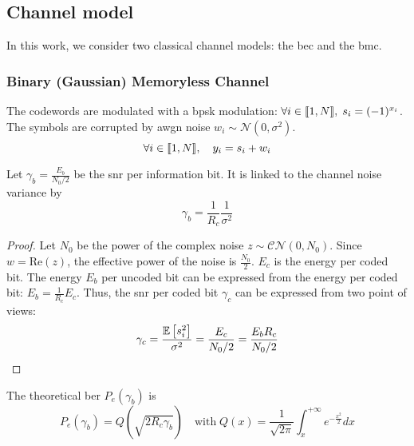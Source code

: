 \subsection{Channel model}
In this work, we consider two classical channel models: the \acrlong{bec} and
the \acrlong{bmc}.

\subsubsection{Binary (Gaussian) Memoryless Channel}
The codewords are modulated with a \acrshort{bpsk} modulation: $\forall i \in
    {\left\llbracket 1, N \right\rrbracket}, \; s_i = (-1)^{x_i}$. The symbols are corrupted by
\acrshort{awgn} noise $w_i \sim \mathcal{N}\left(0, \sigma^2\right)$.
\begin{equation}
    \forall i \in {\left\llbracket 1, N \right\rrbracket}, \quad
    y_i = s_i + w_i
\end{equation}

\begin{iproposition}
    Let $\gamma_b = \frac{E_b}{N_0/2}$ be the \acrshort{snr} per information bit. It is linked to the channel noise variance by
    \begin{equation}
        \gamma_b = \frac{1}{R_c} \frac{1}{\sigma^2}
    \end{equation}
\end{iproposition}

\begin{proof}
    Let $N_0$ be the power of the complex noise $z \sim \mathcal{CN}(0, N_0)$.
    Since $w = \text{Re}(z)$, the effective power of the noise is
    $\frac{N_0}{2}$. $E_c$ is the energy per coded bit. The energy
    $E_b$ per uncoded bit can be expressed from the energy per coded bit: $E_b =
        \frac{1}{R_c} E_c$. Thus, the \acrshort{snr} per coded bit $\gamma_c$ can be
    expressed from two point of views:
    \begin{equation}
        \gamma_c = \frac{\E{s_i^2}}{\sigma^2} = \frac{E_c}{N_0 / 2} = \frac{E_b R_c}{N_0 / 2}
    \end{equation}
\end{proof}

\begin{iproposition}[BER]
    The theoretical \acrshort{ber} $P_e(\gamma_b)$ is
    \begin{equation}
        P_e(\gamma_b) = Q(\sqrt{2 R_c \gamma_b})
        \quad\text{with}\;
        Q(x) = \frac{1}{\sqrt{2 \pi}} \int_x^{+\infty} e^{-\frac{x^2}{2}} dx
    \end{equation}
\end{iproposition}

